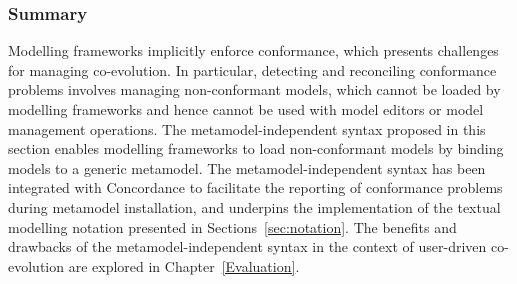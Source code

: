 \subsubsection{Summary}
Modelling frameworks implicitly enforce conformance, which presents challenges for managing co-evolution. In particular, detecting and reconciling conformance problems involves managing non-conformant models, which cannot be loaded by modelling frameworks and hence cannot be used with model editors or model management operations. The metamodel-independent syntax proposed in this section enables modelling frameworks to load non-conformant models by binding models to a generic metamodel. The metamodel-independent syntax has been integrated with Concordance \cite{rose10concordance} to facilitate the reporting of conformance problems during metamodel installation, and underpins the implementation of the textual modelling notation presented in Sections~\ref{sec:notation}. The benefits and drawbacks of the metamodel-independent syntax in the context of user-driven co-evolution are explored in Chapter~\ref{Evaluation}. 
